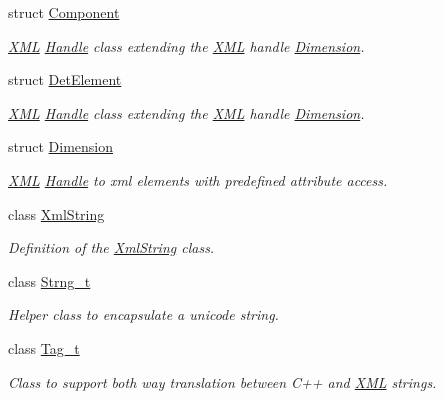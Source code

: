 \begin{DoxyCompactItemize}
struct \hyperlink{struct_d_d4hep_1_1_x_m_l_1_1_component}{Component}
\begin{DoxyCompactList}\small\item\em \hyperlink{namespace_d_d4hep_1_1_x_m_l}{XML} \hyperlink{class_d_d4hep_1_1_handle}{Handle} class extending the \hyperlink{namespace_d_d4hep_1_1_x_m_l}{XML} handle \hyperlink{struct_d_d4hep_1_1_x_m_l_1_1_dimension}{Dimension}. \item\end{DoxyCompactList}\item 
struct \hyperlink{struct_d_d4hep_1_1_x_m_l_1_1_det_element}{DetElement}
\begin{DoxyCompactList}\small\item\em \hyperlink{namespace_d_d4hep_1_1_x_m_l}{XML} \hyperlink{class_d_d4hep_1_1_handle}{Handle} class extending the \hyperlink{namespace_d_d4hep_1_1_x_m_l}{XML} handle \hyperlink{struct_d_d4hep_1_1_x_m_l_1_1_dimension}{Dimension}. \item\end{DoxyCompactList}\item 
struct \hyperlink{struct_d_d4hep_1_1_x_m_l_1_1_dimension}{Dimension}
\begin{DoxyCompactList}\small\item\em \hyperlink{namespace_d_d4hep_1_1_x_m_l}{XML} \hyperlink{class_d_d4hep_1_1_handle}{Handle} to xml elements with predefined attribute access. \item\end{DoxyCompactList}\item 
class \hyperlink{class_d_d4hep_1_1_x_m_l_1_1_xml_string}{XmlString}
\begin{DoxyCompactList}\small\item\em Definition of the \hyperlink{class_d_d4hep_1_1_x_m_l_1_1_xml_string}{XmlString} class. \item\end{DoxyCompactList}\item 
class \hyperlink{class_d_d4hep_1_1_x_m_l_1_1_strng__t}{Strng\_\-t}
\begin{DoxyCompactList}\small\item\em Helper class to encapsulate a unicode string. \item\end{DoxyCompactList}\item 
class \hyperlink{class_d_d4hep_1_1_x_m_l_1_1_tag__t}{Tag\_\-t}
\begin{DoxyCompactList}\small\item\em Class to support both way translation between C++ and \hyperlink{namespace_d_d4hep_1_1_x_m_l}{XML} strings. \item\end{DoxyCompactList}\item 

\end{DoxyCompactItemize}

